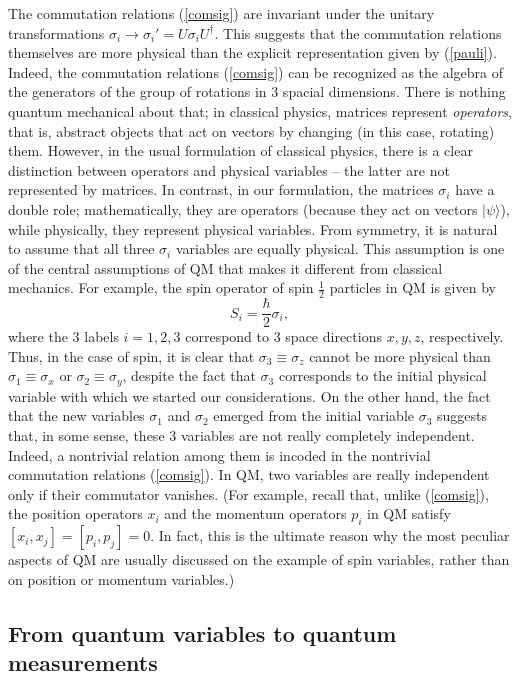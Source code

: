 \documentclass[12pt]{article}
\begin{document}
The commutation relations (\ref{comsig})
are invariant under the unitary 
transformations $\sigma_i\rightarrow \sigma_i'=U\sigma_i U^{\dagger}$.
This suggests that the commutation relations themselves are more 
physical than the explicit representation given by (\ref{pauli}).
Indeed, the commutation relations (\ref{comsig}) can be recognized 
as the algebra of the generators of the group of rotations in 3 
spacial dimensions. There is nothing quantum mechanical about that;
in classical physics, matrices represent {\em operators}, that is, 
abstract objects that act on vectors by changing (in this case, rotating) 
them. However, in the usual formulation of classical physics, 
there is a clear distinction between
operators and physical variables -- the latter are not represented 
by matrices. In contrast, in our formulation, the matrices $\sigma_i$ have a 
double role; mathematically, they are operators (because they act on 
vectors $|\psi\rangle$), while physically, they represent physical 
variables. From symmetry, it is natural to assume that all three $\sigma_i$
variables are equally physical. This assumption is one of the central
assumptions of QM that makes it different from classical mechanics.
For example, the spin operator of spin $\frac{1}{2}$ particles in QM
is given by
\begin{equation}
S_i=\frac{\hbar}{2}\sigma_i ,
\end{equation}
where the 3 labels $i=1,2,3$ correspond to 3 space directions
$x,y,z$, respectively. Thus, in the case of spin,
it is clear that $\sigma_3\equiv \sigma_z$ cannot be 
more physical than $\sigma_1\equiv \sigma_x$ or 
$\sigma_2\equiv \sigma_y$, despite the fact 
that $\sigma_3$ corresponds to the initial physical variable 
with which we started our considerations. On the other hand, 
the fact that the new variables $\sigma_1$ and $\sigma_2$ 
emerged from the initial variable $\sigma_3$ suggests that,
in some sense, these 
3 variables are not really completely independent. Indeed, 
a nontrivial relation among them is incoded in the nontrivial 
commutation relations (\ref{comsig}). In QM, two variables 
are really independent only if their commutator vanishes. 
(For example, recall that, unlike (\ref{comsig}), 
the position operators $x_i$ and 
the momentum operators $p_i$ in QM satisfy 
$[x_i,x_j]=[p_i,p_j]=0$. In fact, this is the ultimate reason why 
the most peculiar aspects of QM are usually discussed 
on the example of spin variables, rather than on position or 
momentum variables.)

\subsection{From quantum variables to quantum measurements}
  
\end{document}
